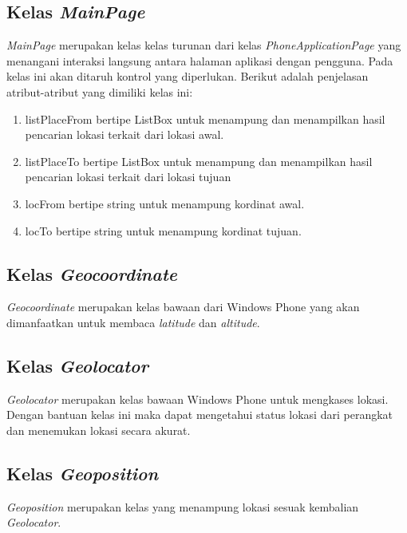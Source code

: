 \subsection{Kelas \textit{MainPage}}
\label{lab:Kelas MainPage}
\hspace{0.5cm} \textit{MainPage} merupakan kelas kelas turunan dari kelas \textit{PhoneApplicationPage} yang menangani interaksi langsung antara halaman aplikasi dengan pengguna. Pada kelas ini akan ditaruh kontrol yang diperlukan. Berikut adalah penjelasan atribut-atribut yang dimiliki kelas ini:
\begin{enumerate}
	\item listPlaceFrom bertipe ListBox untuk menampung dan menampilkan hasil pencarian lokasi terkait dari lokasi awal.
	\item listPlaceTo bertipe ListBox untuk menampung dan menampilkan hasil pencarian lokasi terkait dari lokasi tujuan
	\item locFrom bertipe string untuk menampung kordinat awal.
	\item locTo bertipe string untuk menampung kordinat tujuan.
\end{enumerate}

\subsection{Kelas \textit{Geocoordinate}}
\label{lab:Kelas Geocoordinate}
\hspace{0.5cm} \textit{Geocoordinate} merupakan kelas bawaan dari Windows Phone yang akan dimanfaatkan untuk membaca \textit{latitude} dan \textit{altitude}.

\subsection{Kelas \textit{Geolocator}}
\label{lab:Kelas Geolocator}
\hspace{0.5cm} \textit{Geolocator} merupakan kelas bawaan Windows Phone untuk mengkases lokasi. Dengan bantuan kelas ini maka dapat mengetahui status lokasi dari perangkat dan menemukan lokasi secara akurat.

\subsection{Kelas \textit{Geoposition}}
\label{lab:Kelas Geoposition}
\hspace{0.5cm} \textit{Geoposition} merupakan kelas yang menampung lokasi sesuak kembalian \textit{Geolocator}.

